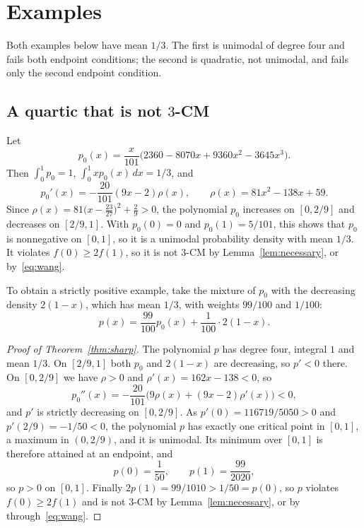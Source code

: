 \documentclass[11pt]{amsart}
\theoremstyle{remark}
\numberwithin{equation}{section}
\begin{document}
\section{Examples}\label{sec:examples}

Both examples below have mean $1/3$. The first is unimodal of degree four
and fails both endpoint conditions; the second is quadratic, not unimodal,
and fails only the second endpoint condition.

\subsection{A quartic that is not \texorpdfstring{$3$}{3}-CM}

Let
\begin{equation}\label{eq:h}
p_0(x)=\frac x{101}\bigl(2360-8070x+9360x^2-3645x^3\bigr).
\end{equation}
Then $\int_0^1p_0=1$, $\int_0^1xp_0(x)\,dx=1/3$, and
\begin{equation}\label{eq:hprime}
p_0'(x)=-\frac{20}{101}(9x-2)\rho(x),\qquad \rho(x)=81x^2-138x+59.
\end{equation}
Since $\rho(x)=81\bigl(x-\tfrac{23}{27}\bigr)^2+\tfrac29>0$, the polynomial $p_0$
increases on $[0,2/9]$ and decreases on $[2/9,1]$. With $p_0(0)=0$ and
$p_0(1)=5/101$, this shows that $p_0$ is nonnegative on $[0,1]$, so it is a
unimodal probability density with mean $1/3$. It violates $f(0)\ge2f(1)$,
so it is not $3$-CM by Lemma~\ref{lem:necessary}, or by~\eqref{eq:wang}.

To obtain a strictly positive example, take the mixture of $p_0$ with
the decreasing density $2(1-x)$, which has mean $1/3$, with weights
$99/100$ and $1/100$:
\begin{equation}\label{eq:p}
p(x)=\frac{99}{100}p_0(x)+\frac1{100}\cdot2(1-x).
\end{equation}

\begin{proof}[Proof of Theorem~\ref{thm:sharp}]
The polynomial $p$ has degree four, integral $1$ and mean $1/3$. On
$[2/9,1]$ both $p_0$ and $2(1-x)$ are decreasing, so $p'<0$ there. On
$[0,2/9]$ we have $\rho>0$ and $\rho'(x)=162x-138<0$, so
\[
p_0''(x)=-\frac{20}{101}\bigl(9\rho(x)+(9x-2)\rho'(x)\bigr)<0,
\]
and $p'$ is strictly decreasing on $[0,2/9]$. As $p'(0)=116719/5050>0$
and $p'(2/9)=-1/50<0$, the polynomial $p$ has exactly one critical point
in $[0,1]$, a maximum in $(0,2/9)$, and it is unimodal. Its minimum over
$[0,1]$ is therefore attained at an endpoint, and
\[
p(0)=\frac1{50},\qquad p(1)=\frac{99}{2020},
\]
so $p>0$ on $[0,1]$. Finally $2p(1)=99/1010>1/50=p(0)$, so $p$ violates
$f(0)\ge2f(1)$ and is not $3$-CM by Lemma~\ref{lem:necessary}, or
by~\cite[Theorem~5]{Wan15} through~\eqref{eq:wang}.
\end{proof}
\end{document}
